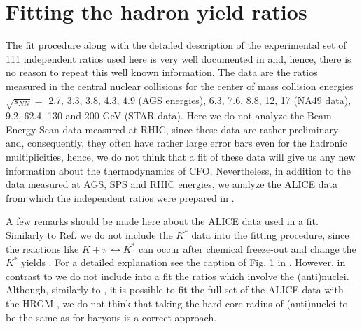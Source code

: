 \documentclass[12pt]{article}
\begin{document}
\section{Fitting the hadron yield ratios}

The fit procedure along with the detailed description of  the experimental set of 111 independent ratios  used here is very well documented in  \cite{Horn,Veta14,Bugaev:2016ujp}  and, hence, there is no reason to repeat this well known information. 
The data are the ratios measured in the  central nuclear collisions  for the center of mass collision energies    $\sqrt{s_{NN}} = $ 2.7, 3.3, 3.8, 4.3, 4.9 (AGS energies), 6.3, 7.6, 8.8, 12, 17 (NA49 data), 9.2, 62.4, 130 and 200 GeV (STAR data).  Here we do not analyze  the Beam  Energy Scan data measured at RHIC, since these data are rather preliminary and, consequently, they often have rather large error bars even for the hadronic multiplicities, hence,  we do not think that a fit of these data will give us any new information about the thermodynamics of CFO.   Nevertheless,  in addition to the data measured at AGS, SPS and RHIC energies, we analyze the ALICE data  \cite{Abelev:2013vea,Abelev:2013zaa,Abelev:2013xaa,Knospe:2013tda,Adam:2015vda,Donigus:2015bsa,Adam:2015yta}
from which the independent ratios were prepared in  \cite{Bugaev:2016}. 

A few remarks should be made  here about the ALICE data used in a fit.
Similarly to Ref.  \cite{Stachel:2013zma} we 
do not include the $K^*$ data into the fitting procedure,  since the reactions like $K+\pi \leftrightarrow K^*$ can occur after chemical freeze-out and change the $K^*$ yields \cite{Stachel:2013zma}. For  a detailed explanation see the caption of Fig. 1 in \cite{Stachel:2013zma}. 
However, in contrast to \cite{Stachel:2013zma} we do not include into a fit the ratios which  involve  the (anti)nuclei. Although, similarly to  \cite{Stachel:2013zma}, it is possible to fit the full set of the ALICE data \cite{Abelev:2013vea,Abelev:2013zaa,Abelev:2013xaa,Knospe:2013tda,Adam:2015vda,Donigus:2015bsa,Adam:2015yta} with the HRGM \cite{Bugaev:2016},
we do not  think that taking the hard-core radius of  (anti)nuclei to be the same as for baryons is a correct approach.
\end{document}
